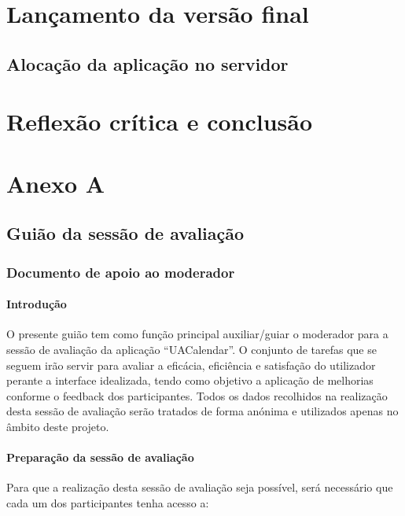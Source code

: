 \documentclass[11pt, twoside]{report}
\begin{document}
	\chapter{Lançamento da versão final}
	\section{Alocação da aplicação no servidor}
	
	
	\chapter{Reflexão crítica e conclusão}
	
	
	
	

	

	
	\chapter*{Anexo A}
	
	\pagestyle{empty}
	
	\section*{Guião da sessão de avaliação}
	\subsection*{Documento de apoio ao moderador}
	
	
	\subsubsection*{Introdução}
	O presente guião tem como função principal auxiliar/guiar o moderador para a sessão de avaliação da aplicação “UACalendar”. O conjunto de tarefas que se seguem irão servir para avaliar a eficácia, eficiência e satisfação do utilizador perante a interface idealizada, tendo como objetivo a aplicação de melhorias conforme o feedback dos participantes.
	Todos os dados recolhidos na realização desta sessão de avaliação serão tratados de forma anónima e utilizados apenas no âmbito deste projeto.
	
	
	\subsubsection*{Preparação da sessão de avaliação}
	Para que a realização desta sessão de avaliação seja possível, será necessário que cada um dos participantes tenha acesso a:
	
\end{document}
